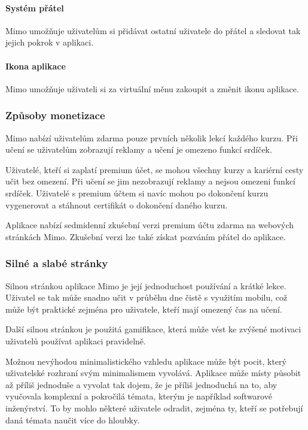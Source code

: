 \paragraph{Systém přátel} Mimo umožňuje uživatelům si přidávat ostatní uživatele do přátel a sledovat tak jejich pokrok v aplikaci.

\paragraph{Ikona aplikace} Mimo umožňuje uživateli si za virtuální měnu zakoupit a změnit ikonu aplikace.


\subsubsection{Způsoby monetizace}

Mimo nabízí uživatelům zdarma pouze prvních několik lekcí každého kurzu. Při učení se uživatelům zobrazují reklamy a učení je omezeno funkcí srdíček.

Uživatelé, kteří si zaplatí premium účet, se mohou všechny kurzy a kariérní cesty učit bez omezení. Při učení se jim nezobrazují reklamy a nejsou omezeni funkcí srdíček. Uživatelé s premium účtem si navíc mohou po dokončení kurzu vygenerovat a stáhnout certifikát o dokončení daného kurzu. 

Aplikace nabízí sedmidenní zkušební verzi premium účtu zdarma na webových stránkách Mimo. Zkušební verzi lze také získat pozváním přátel do aplikace.

\subsubsection{Silné a slabé stránky}

Silnou stránkou aplikace Mimo je její jednoduchost používání a krátké lekce. Uživatel se tak může snadno učit v průběhu dne čistě s využitím mobilu, což může být praktické zejména pro uživatele, kteří mají omezený čas na učení.

Další silnou stránkou je použitá gamifikace, která může vést ke zvýšené motivaci uživatelů používat aplikaci pravidelně.

Možnou nevýhodou minimalistického vzhledu aplikace může být pocit, který uživatelské rozhraní svým minimalismem vyvolává. Aplikace může místy působit až příliš jednoduše a vyvolat tak dojem, že je příliš jednoduchá na to, aby vyučovala komplexní a pokročilá témata, kterým je například softwarové inženýrství. To by mohlo některé uživatele odradit, zejména ty, kteří se potřebují daná témata naučit více do hloubky.

